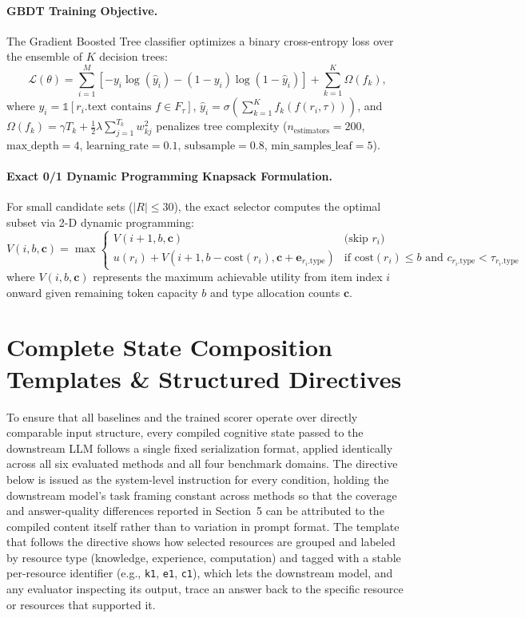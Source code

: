 \documentclass{article}
\begin{document}
\paragraph{GBDT Training Objective.} The Gradient Boosted Tree classifier optimizes a binary cross-entropy loss over the ensemble of $K$ decision trees:
\begin{equation}
\mathcal{L}(\theta) = \sum_{i=1}^M \left[ -y_i \log(\hat{y}_i) - (1 - y_i) \log(1 - \hat{y}_i) \right] + \sum_{k=1}^K \Omega(f_k),
\end{equation}
where $y_i = \mathbb{1}[r_i.\text{text contains } f \in F_\tau]$, $\hat{y}_i = \sigma\left(\sum_{k=1}^K f_k(f(r_i, \tau))\right)$, and $\Omega(f_k) = \gamma T_k + \frac{1}{2}\lambda \sum_{j=1}^{T_k} w_{kj}^2$ penalizes tree complexity ($n_{\text{estimators}}=200$, $\text{max\_depth}=4$, $\text{learning\_rate}=0.1$, $\text{subsample}=0.8$, $\text{min\_samples\_leaf}=5$).

\paragraph{Exact 0/1 Dynamic Programming Knapsack Formulation.} For small candidate sets ($|R| \leq 30$), the exact selector computes the optimal subset via 2-D dynamic programming:
\begin{equation}
V(i, b, \mathbf{c}) = \max \begin{cases}
V(i+1, b, \mathbf{c}) & \text{(skip } r_i\text{)} \\
u(r_i) + V(i+1, b - \text{cost}(r_i), \mathbf{c} + \mathbf{e}_{r_i.\text{type}}) & \text{if } \text{cost}(r_i) \leq b \text{ and } c_{r_i.\text{type}} < \tau_{r_i.\text{type}}
\end{cases}
\end{equation}
where $V(i, b, \mathbf{c})$ represents the maximum achievable utility from item index $i$ onward given remaining token capacity $b$ and type allocation counts $\mathbf{c}$.

\section{Complete State Composition Templates \& Structured Directives}

To ensure that all baselines and the trained scorer operate over directly comparable input structure, every compiled cognitive state passed to the downstream LLM follows a single fixed serialization format, applied identically across all six evaluated methods and all four benchmark domains. The directive below is issued as the system-level instruction for every condition, holding the downstream model's task framing constant across methods so that the coverage and answer-quality differences reported in Section~5 can be attributed to the compiled content itself rather than to variation in prompt format. The template that follows the directive shows how selected resources are grouped and labeled by resource type (knowledge, experience, computation) and tagged with a stable per-resource identifier (e.g., \texttt{k1}, \texttt{e1}, \texttt{c1}), which lets the downstream model, and any evaluator inspecting its output, trace an answer back to the specific resource or resources that supported it.
\end{document}
